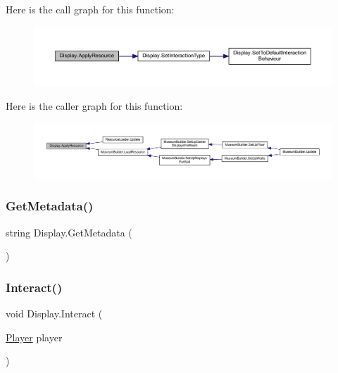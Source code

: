 Here is the call graph for this function\+:
\nopagebreak
\begin{figure}[H]
\begin{center}
\leavevmode
\includegraphics[width=350pt]{class_display_aa1d23e0e870c59c63e2f040e84ef0121_cgraph}
\end{center}
\end{figure}
Here is the caller graph for this function\+:
\nopagebreak
\begin{figure}[H]
\begin{center}
\leavevmode
\includegraphics[width=350pt]{class_display_aa1d23e0e870c59c63e2f040e84ef0121_icgraph}
\end{center}
\end{figure}
\mbox{\label{class_display_a293687a976cbe23a09b7c6ddef36a48d}} 
\subsubsection{\texorpdfstring{Get\+Metadata()}{GetMetadata()}}
{\footnotesize\ttfamily string Display.\+Get\+Metadata (\begin{DoxyParamCaption}{ }\end{DoxyParamCaption})}

\mbox{\label{class_display_a43fc2a6f19bbf2f1bdb676392b37e921}} 
\subsubsection{\texorpdfstring{Interact()}{Interact()}}
{\footnotesize\ttfamily void Display.\+Interact (\begin{DoxyParamCaption}\item[{\mbox{\hyperlink{class_player}{Player}}}]{player }\end{DoxyParamCaption})}



